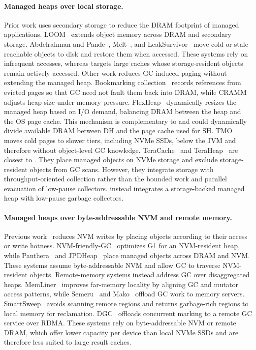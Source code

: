 \paragraph{\textbf{Managed heaps over local storage.}}
Prior work uses secondary storage to reduce the DRAM footprint of managed applications.
LOOM~\cite{kaehler:loom} extends object memory across DRAM and secondary storage.
Abdelrahman and Pande~\cite{abdelrahman:memorygc}, Melt~\cite{bond:melt}, and LeakSurvivor~\cite{leaksurvivor} move cold or stale reachable objects to disk and restore them when accessed.
These systems rely on infrequent accesses, whereas \chipperName{} targets large caches whose storage-resident objects remain actively accessed.
Other work reduces GC-induced paging without extending the managed heap.
Bookmarking collection~\cite{hertz:bookmarking} records references from evicted pages so that GC need not fault them back into DRAM, while CRAMM~\cite{yang:cramm} adjusts heap size under memory pressure.
FlexHeap~\cite{kolokasis:flexheap} dynamically resizes the managed heap based on I/O demand, balancing DRAM between the heap and the OS page cache.
This mechanism is complementary to \chipperName{} and could dynamically divide available DRAM between DH and the page cache used for SH.
TMO~\cite{weiner:tmo} moves cold pages to slower tiers, including NVMe SSDs, below the JVM and therefore without object-level GC knowledge.
TeraCache~\cite{kolokasis:teracache} and TeraHeap~\cite{teraheap} are closest to \chipperName{}.
They place managed objects on NVMe storage and exclude storage-resident objects from GC scans.
However, they integrate storage with throughput-oriented collection rather than the bounded work and parallel evacuation of low-pause collectors.
\chipperName{} instead integrates a storage-backed managed heap with low-pause garbage collectors.

\paragraph{\textbf{Managed heaps over byte-addressable NVM and remote memory.}}
Previous work~\cite{akram:ration,akram:crystal,gcmove,thingc} reduces NVM writes by placing objects according to their access or write hotness.
NVM-friendly-GC~\cite{Xu:gc_evaluation} optimizes G1 for an NVM-resident heap, while Panthera~\cite{wang:Panthera} and JPDHeap~\cite{jpd_heap} place managed objects across DRAM and NVM.
These systems assume byte-addressable NVM and allow GC to traverse NVM-resident objects.
Remote-memory systems instead address GC over disaggregated heaps.
MemLiner~\cite{wang:memliner} improves far-memory locality by aligning GC and mutator access patterns, while Semeru~\cite{wang:semeru} and Mako~\cite{ma:mako} offload GC work to memory servers.
SmartSweep~\cite{kolokasis:smartsweep} avoids scanning remote regions and returns garbage-rich regions to local memory for reclamation.
DGC~\cite{hongtao:dgc} offloads concurrent marking to a remote GC service over RDMA.
These systems rely on byte-addressable NVM or remote DRAM, which offer lower capacity per device than local NVMe SSDs and are therefore less suited to large result caches.

